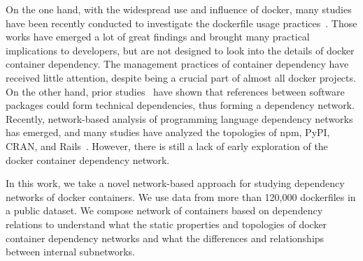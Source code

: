 \documentclass[sigconf]{acmart}
\begin{document}
On the one hand, with the widespread use and influence of docker, many
studies have been recently conducted to investigate the dockerfile usage practices~\cite{cito2017empirical,zhang2019clustering,henkel2020mining}. Those works have emerged a lot of great findings and brought many practical implications
to developers, but are not designed to look into the details
of docker container dependency. 
The management practices of container dependency have received little
attention, despite being a crucial part of almost all docker projects. 
On the other hand, prior studies~\cite{blincoe2015ecosystems,decan2016topology} have shown that references between software packages could form technical dependencies, thus forming a dependency network. Recently, network-based analysis of programming language dependency networks has emerged, and many studies have analyzed the topologies of npm, PyPI, CRAN, and Rails~\cite{wittern2016look,decan2016topology,zhang2018within}. 
However, there is still a lack of early exploration of the docker container dependency network.

 

In this work, we take a novel network-based approach
for studying dependency networks of docker containers. We use data from more than 120,000 dockerfiles in a public dataset. We compose network of containers based
on dependency relations to understand what the static properties and topologies of docker container dependency networks and what the differences and relationships between internal subnetworks.
\end{document}
